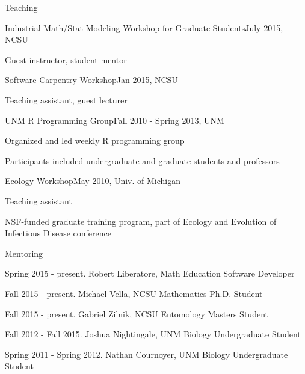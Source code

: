 \documentclass{resume} %
\begin{document}
\begin{rSection}{Teaching}
\begin{rSubsection}{Industrial Math/Stat Modeling Workshop for Graduate Students}{July 2015, NCSU}{}{}
\item Guest instructor, student mentor
\end{rSubsection}
\begin{rSubsection}{Software Carpentry Workshop}{Jan 2015, NCSU}{}{}
\item Teaching assistant, guest lecturer
\end{rSubsection}
\begin{rSubsection}{UNM R Programming Group}{Fall 2010 - Spring 2013, UNM}{}{}
\item Organized and led weekly R programming group
\item Participants included undergraduate and graduate students and professors
\end{rSubsection}
\begin{rSubsection}{Ecology Workshop}{May 2010, Univ. of Michigan}{}{}
\item Teaching assistant
\item NSF-funded graduate training program, part of Ecology and Evolution of Infectious
Disease conference
\end{rSubsection}
\end{rSection}

\begin{rSection}{Mentoring}
\item Spring 2015 - present. Robert Liberatore, Math Education Software Developer
\item Fall 2015 - present. Michael Vella, NCSU Mathematics Ph.D. Student
\item Fall 2015 - present. Gabriel Zilnik, NCSU Entomology Masters Student
\item Fall 2012 - Fall 2015. Joshua Nightingale, UNM Biology Undergraduate Student
\item Spring 2011 - Spring 2012. Nathan Cournoyer, UNM Biology Undergraduate Student
\end{rSection}

\end{document}
